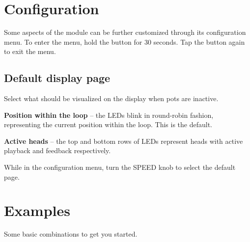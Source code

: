 \documentclass[11pt]{article}
\begin{document}
\noindent\begin{minipage}[t]{0.45\textwidth}\setlength{\parskip}{6pt}

\section{Configuration}

Some aspects of the module can be further customized through its configuration
menu. To enter the menu, hold the button for 30 seconds. Tap the button again
to exit the menu.

\subsection{Default display page}

Select what should be visualized on the display when pots are inactive.

\textbf{Position within the loop} -- the LEDs blink in round-robin fashion,
  representing the current position within the loop. This is the default.

\textbf{Active heads} -- the top and bottom rows of LEDs represent heads with
  active playback and feedback respectively.

While in the configuration menu, turn the SPEED knob to select the default page.

\end{minipage}

\newpage
\section{Examples}

Some basic combinations to get you started.
\end{document}
